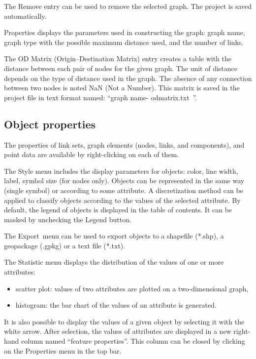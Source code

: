 \documentclass{article}
\begin{document}
The Remove entry can be used to remove the selected graph. The project is saved automatically.

Properties displays the parameters used in constructing the graph: graph name, graph type with the possible maximum distance used, and the number of links.

The OD Matrix (Origin–Destination Matrix) entry creates a table with the distance between each pair of nodes for the given graph. The unit of distance depends on the type of distance used in the graph. The absence of any connection between two nodes is noted NaN (Not a Number). This matrix is saved in the project file in text format named: “graph name-
odmatrix.txt~”.

\subsection{Object properties}
\label{properties}
The properties of link sets, graph elements (nodes, links, and components), and point data are available by right-clicking on each of them.

The Style menu includes the display parameters for objects: color, line width, label, symbol size (for nodes only). Objects can be represented in the same way (single symbol) or according to some attribute. A discretization method can be applied to classify objects according to the values of the selected attribute. By default, the legend of objects is displayed in the table of contents. It can be masked by unchecking
the Legend button.

The Export~menu can be used to export objects to a shapefile (*.shp), a geopackage (.gpkg) or a text file (*.txt).

The Statistic menu displays the distribution of the values of one or more attributes:
\begin{itemize}
	\item scatter plot: values of two attributes are plotted on a two-dimensional graph,
	\item histogram: the bar chart of the values of an attribute is generated.
\end{itemize}

It is also possible to display the values of a given object by selecting it with the white arrow. After selection, the values of attributes are displayed in a new right-hand column named “feature properties”. This column can be closed by clicking on the Properties menu in the top bar.
\end{document}
